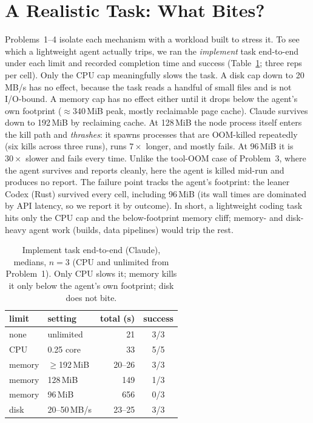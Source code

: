 \documentclass[10pt,twocolumn]{article}
\newcommand{\uu}[1]{\,\textsf{#1}}
\begin{document}
\section{A Realistic Task: What Bites?}
\label{sec:e2e}

Problems~1--4 isolate each mechanism with a workload built to stress it. To
see which a lightweight agent actually trips, we ran the \emph{implement}
task end-to-end under each limit and recorded completion time and success
(Table~\ref{tab:e2e}; three reps per cell). Only the CPU cap meaningfully slows the task. A disk cap down to 20\uu{MB/s}
has no effect, because the task reads a handful of small files and is not
I/O-bound. A memory cap has no effect either until it drops below the
agent's own footprint (${\approx}340$\,MiB peak, mostly reclaimable page
cache). Claude survives down to 192\,MiB by reclaiming cache. At 128\,MiB
the node process itself enters the kill path and \emph{thrashes}: it spawns
processes that are OOM-killed repeatedly (six kills across three runs), runs
$7\times$ longer, and mostly fails. At 96\,MiB it is $30\times$ slower and
fails every time. Unlike the tool-OOM case of Problem~3, where the agent survives and
reports cleanly, here the agent is killed mid-run and produces no report.
The failure point tracks the agent's footprint: the leaner Codex (Rust)
survived every cell, including 96\,MiB (its wall times are dominated by API
latency, so we report it by outcome). In short, a lightweight coding task
hits only the CPU cap and the below-footprint memory cliff; memory- and
disk-heavy agent work (builds, data pipelines) would trip the rest.

\begin{table}[t]\centering\footnotesize
\setlength{\tabcolsep}{4pt}
\caption{Implement task end-to-end (Claude), medians, $n{=}3$ (CPU and
unlimited from Problem~1). Only CPU slows it; memory kills it only below the
agent's own footprint; disk does not bite.}
\label{tab:e2e}
\begin{tabular}{@{}llrc@{}}
\toprule
limit & setting & total (s) & success\\
\midrule
none   & unlimited        & 21     & 3/3 \\
CPU    & 0.25 core        & 33     & 5/5 \\
memory & $\ge$192\,MiB    & 20--26 & 3/3 \\
memory & 128\,MiB         & 149    & 1/3 \\
memory & 96\,MiB          & 656    & 0/3 \\
disk   & 20--50\uu{MB/s}  & 23--25 & 3/3 \\
\bottomrule
\end{tabular}
\end{table}
\end{document}
